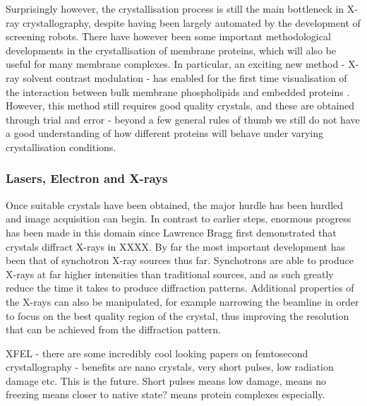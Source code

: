 \documentclass[a4paper,11pt,twoside,openright]{scrbook}
\let\cite\supercite
\begin{document}
Surprisingly however, the crystallisation process is still the main bottleneck in X-ray crystallography, despite having been largely automated by the development of screening robots. There have however been some important methodological developments in the crystallisation of membrane proteins, which will also be useful for many membrane complexes. In particular, an exciting new method - X-ray solvent contrast modulation - has enabled for the first time visualisation of the interaction between bulk membrane phospholipids and embedded proteins \cite{Norimatsu2017}. However, this method still requires good quality crystals, and these are obtained through trial and error - beyond a few general rules of thumb we still do not have a good understanding of how different proteins will behave under varying crystallisation conditions.


\subsubsection{Lasers, Electron and X-rays}
Once suitable crystals have been obtained, the major hurdle has been hurdled and image acquisition can begin. In contrast to earlier steps, enormous progress has been made in this domain since Lawrence Bragg first demonstrated that crystals diffract X-rays in XXXX. By far the most important development has been that of synchotron X-ray sources thus far. Synchotrons are able to produce X-rays at far higher intensities than traditional sources, and as such greatly reduce the time it takes to produce diffraction patterns. Additional properties of the X-rays can also be manipulated, for example narrowing the beamline in order to focus on the best quality region of the crystal, thus improving the resolution that can be achieved from the diffraction pattern.

XFEL - there are some incredibly cool looking papers on femtosecond crystallography - benefits are nano crystals, very short pulses, low radiation damage etc. This is the future. Short pulses means low damage, means no freezing means closer to native state? means protein complexes especially.
\end{document}
